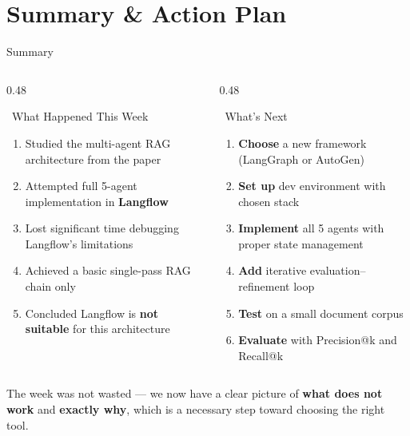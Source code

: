 \documentclass[aspectratio=169]{beamer}
\begin{document}
\section{Summary \& Action Plan}

\begin{frame}{Summary}
  \begin{columns}[T]
    \begin{column}{0.48\textwidth}
      \begin{alertblock}{\faHistory\ What Happened This Week}
        \small
        \begin{enumerate}
          \item Studied the multi-agent RAG architecture from the paper
          \item Attempted full 5-agent implementation in \textbf{Langflow}
          \item Lost significant time debugging Langflow's limitations
          \item Achieved a basic single-pass RAG chain only
          \item Concluded Langflow is \textbf{not suitable} for this architecture
        \end{enumerate}
      \end{alertblock}
    \end{column}
    \begin{column}{0.48\textwidth}
      \begin{exampleblock}{\faRoad\ What's Next}
        \small
        \begin{enumerate}
          \item \textbf{Choose} a new framework (LangGraph or AutoGen)
          \item \textbf{Set up} dev environment with chosen stack
          \item \textbf{Implement} all 5 agents with proper state management
          \item \textbf{Add} iterative evaluation--refinement loop
          \item \textbf{Test} on a small document corpus
          \item \textbf{Evaluate} with Precision@k and Recall@k
        \end{enumerate}
      \end{exampleblock}
    \end{column}
  \end{columns}
  \vspace{0.4cm}
  \begin{block}{}
    \centering\small
    \faLightbulb\quad The week was not wasted — we now have a clear picture of \textbf{what does not work} and \textbf{exactly why}, which is a necessary step toward choosing the right tool.
  \end{block}
\end{frame}
\end{document}
